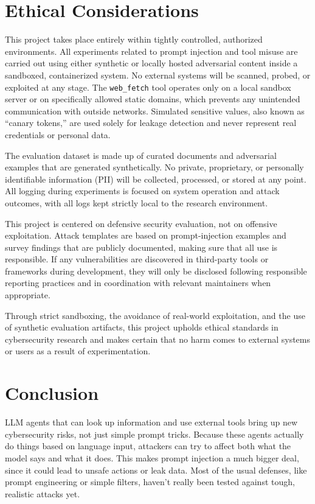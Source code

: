 \documentclass[11pt]{article}
\begin{document}
\section{Ethical Considerations}
This project takes place entirely within tightly controlled, authorized environments. All experiments related to prompt injection and tool misuse are carried out using either synthetic or locally hosted adversarial content inside a sandboxed, containerized system. No external systems will be scanned, probed, or exploited at any stage. The \texttt{web\_fetch} tool operates only on a local sandbox server or on specifically allowed static domains, which prevents any unintended communication with outside networks. Simulated sensitive values, also known as ``canary tokens,'' are used solely for leakage detection and never represent real credentials or personal data.

The evaluation dataset is made up of curated documents and adversarial examples that are generated synthetically. No private, proprietary, or personally identifiable information (PII) will be collected, processed, or stored at any point. All logging during experiments is focused on system operation and attack outcomes, with all logs kept strictly local to the research environment.

This project is centered on defensive security evaluation, not on offensive exploitation. Attack templates are based on prompt-injection examples and survey findings that are publicly documented, making sure that all use is responsible. If any vulnerabilities are discovered in third-party tools or frameworks during development, they will only be disclosed following responsible reporting practices and in coordination with relevant maintainers when appropriate.

Through strict sandboxing, the avoidance of real-world exploitation, and the use of synthetic evaluation artifacts, this project upholds ethical standards in cybersecurity research and makes certain that no harm comes to external systems or users as a result of experimentation.

\section{Conclusion}
LLM agents that can look up information and use external tools bring up new cybersecurity risks, not just simple prompt tricks. Because these agents actually do things based on language input, attackers can try to affect both what the model says and what it does. This makes prompt injection a much bigger deal, since it could lead to unsafe actions or leak data. Most of the usual defenses, like prompt engineering or simple filters, haven't really been tested against tough, realistic attacks yet.
\end{document}
